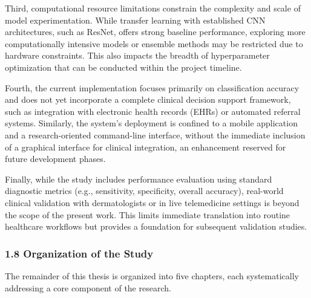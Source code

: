 \documentclass[
  12pt,
  oneside]{article}
\begin{document}
Third, computational resource limitations constrain the complexity and
scale of model experimentation. While transfer learning with established
CNN architectures, such as ResNet, offers strong baseline performance,
exploring more computationally intensive models or ensemble methods may
be restricted due to hardware constraints. This also impacts the breadth
of hyperparameter optimization that can be conducted within the project
timeline.

Fourth, the current implementation focuses primarily on classification
accuracy and does not yet incorporate a complete clinical decision
support framework, such as integration with electronic health records
(EHRs) or automated referral systems. Similarly, the system's deployment
is confined to a mobile application and a research-oriented command-line
interface, without the immediate inclusion of a graphical interface for
clinical integration, an enhancement reserved for future development
phases.

Finally, while the study includes performance evaluation using standard
diagnostic metrics (e.g., sensitivity, specificity, overall accuracy),
real-world clinical validation with dermatologists or in live
telemedicine settings is beyond the scope of the present work. This
limits immediate translation into routine healthcare workflows but
provides a foundation for subsequent validation studies.

\subsubsection{1.8 Organization of the
Study}\label{organization-of-the-study}

The remainder of this thesis is organized into five chapters, each
systematically addressing a core component of the research.
\end{document}
